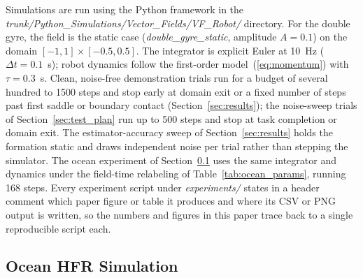 \documentclass[lettersize,journal]{IEEEtran}
\begin{document}
Simulations are run using the Python framework in the
\textit{trunk/Python\_Simulations/Vector\_Fields/VF\_Robot/} directory.
For the double gyre, the field is the static case
(\textit{double\_gyre\_static}, amplitude $A = 0.1$) on the domain
$[-1, 1] \times [-0.5, 0.5]$. The integrator is explicit Euler at
10~Hz ($\Delta t = 0.1$~s); robot dynamics follow the first-order
model~(\ref{eq:momentum}) with $\tau = 0.3$~s. Clean, noise-free
demonstration trials run for a budget of several hundred to 1500 steps
and stop early at domain exit or a fixed number of steps past first
saddle or boundary contact (Section~\ref{sec:results}); the noise-sweep trials of
Section~\ref{sec:test_plan} run up to 500 steps and stop at task
completion or domain exit. The estimator-accuracy sweep of
Section~\ref{sec:results} holds the formation static and draws
independent noise per trial rather than stepping the simulator. The
ocean experiment of Section~\ref{sec:ocean_sim} uses the same
integrator and dynamics under the field-time relabeling of
Table~\ref{tab:ocean_params}, running 168 steps. Every experiment
script under \textit{experiments/} states in a header comment which
paper figure or table it produces and where its CSV or PNG output is
written, so the numbers and figures in this paper trace back to a
single reproducible script each.

\subsection{Ocean HFR Simulation}
\label{sec:ocean_sim}
\end{document}
